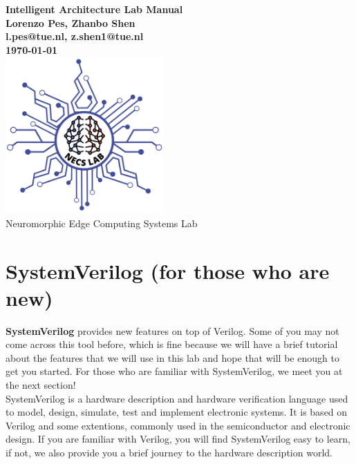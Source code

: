 \documentclass{article}
\begin{document}

\begin{titlepage}
    \centering
    \vfill
    {\bfseries\Large
        Intelligent Architecture Lab Manual\\
        \vskip2cm
        Lorenzo Pes, Zhanbo Shen \\
        l.pes@tue.nl, z.shen1@tue.nl \\
        
    
        \vskip1cm
        \today \\
    }    
    \vfill
    \includegraphics[width=6cm]{NECS.png} \\
    \vskip2cm
    Neuromorphic Edge Computing Systems Lab \\
    \vfill
\end{titlepage}

\tableofcontents

\newpage 
\section{SystemVerilog \footnotesize(for those who are new)}

{\large\textbf{SystemVerilog}} provides new features on top of Verilog. Some of you may not come across this tool before, which is fine because we will have a brief tutorial about the features that we will use in this lab and hope that will be enough to get you started. For those who are familiar with SystemVerilog, we meet you at the next section!\\

SystemVerilog is a hardware description and hardware verification language used to model, design, simulate, test and implement electronic systems. It is based on Verilog and some extentions, commonly used in the semiconductor and electronic design. If you are familiar with Verilog, you will find SystemVerilog easy to learn, if not, we also provide you a brief journey to the hardware description world.\\
\end{document}
